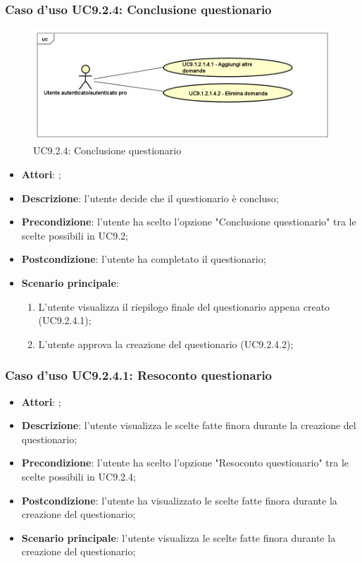 		\subsubsection{Caso d'uso UC9.2.4: Conclusione questionario}
		\label{UC9.2.4}
		\begin{figure}[h]
			\centering
			\includegraphics[scale=0.5,keepaspectratio]{UML/UC9_2_4.png}
			\caption{UC9.2.4: Conclusione questionario}
		\end{figure}
		\FloatBarrier
		\begin{itemize}
			\item \textbf{Attori}: \uaupro; 
			\item \textbf{Descrizione}: l'utente decide che il questionario è concluso;
			\item \textbf{Precondizione}: l'utente ha scelto l'opzione "Conclusione questionario" tra le scelte possibili in UC9.2;
			\item \textbf{Postcondizione}: l'utente ha completato il questionario;
			\item \textbf{Scenario principale}: 
				\begin{enumerate}
					\item L'utente visualizza il riepilogo finale del questionario appena creato (UC9.2.4.1); 
					\item L'utente approva la creazione del questionario (UC9.2.4.2); 
				\end{enumerate}
		\end{itemize}
				
			\subsubsection{Caso d'uso UC9.2.4.1: Resoconto questionario}
			\label{UC9.2.4.1}
			\begin{itemize}
				\item \textbf{Attori}: \uaupro;
				\item \textbf{Descrizione}: l'utente visualizza le scelte fatte finora durante la creazione del questionario;
				\item \textbf{Precondizione}: l'utente ha scelto l'opzione "Resoconto questionario" tra le scelte possibili in UC9.2.4;
				\item \textbf{Postcondizione}: l'utente ha visualizzato le scelte fatte finora durante la creazione del questionario;
				\item \textbf{Scenario principale}: l'utente visualizza le scelte fatte finora durante la creazione del questionario;
			\end{itemize}
			
